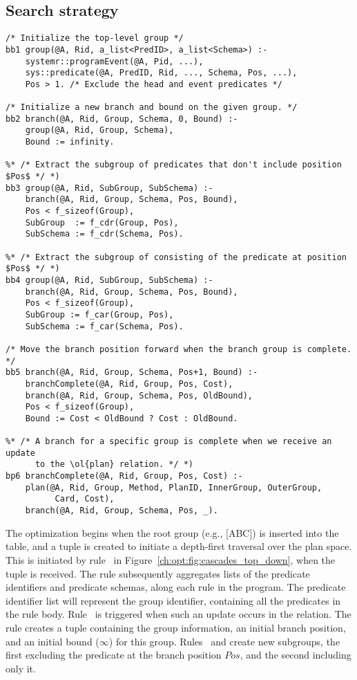 \subsection{Search strategy}
\label{ch:opt:sec:cascades_search}

\begin{figure*}
\ssp
\centering
\begin{lstlisting}
/* Initialize the top-level group */
bb1 group(@A, Rid, a_list<PredID>, a_list<Schema>) :-
    systemr::programEvent(@A, Pid, ...),
    sys::predicate(@A, PredID, Rid, ..., Schema, Pos, ...),
    Pos > 1. /* Exclude the head and event predicates */

/* Initialize a new branch and bound on the given group. */
bb2 branch(@A, Rid, Group, Schema, 0, Bound) :-
    group(@A, Rid, Group, Schema),
    Bound := infinity.

%* /* Extract the subgroup of predicates that don't include position $Pos$ */ *)
bb3 group(@A, Rid, SubGroup, SubSchema) :-
    branch(@A, Rid, Group, Schema, Pos, Bound),
    Pos < f_sizeof(Group),
    SubGroup  := f_cdr(Group, Pos),
    SubSchema := f_cdr(Schema, Pos).

%* /* Extract the subgroup of consisting of the predicate at position $Pos$ */ *)
bb4 group(@A, Rid, SubGroup, SubSchema) :-
    branch(@A, Rid, Group, Schema, Pos, Bound),
    Pos < f_sizeof(Group),
    SubGroup := f_car(Group, Pos),
    SubSchema := f_car(Schema, Pos).

/* Move the branch position forward when the branch group is complete. */
bb5 branch(@A, Rid, Group, Schema, Pos+1, Bound) :-
    branchComplete(@A, Rid, Group, Pos, Cost),
    branch(@A, Rid, Group, Schema, Pos, OldBound),
    Pos < f_sizeof(Group),
    Bound := Cost < OldBound ? Cost : OldBound.

%* /* A branch for a specific group is complete when we receive an update 
      to the \ol{plan} relation. */ *)
bp6 branchComplete(@A, Rid, Group, Pos, Cost) :-
    plan(@A, Rid, Group, Method, PlanID, InnerGroup, OuterGroup, 
          Card, Cost),
    branch(@A, Rid, Group, Schema, Pos, _).
\end{lstlisting}
\caption{\label{ch:opt:fig:cascades_top_down} Cascades top-down search strategy rules.}
\end{figure*}

The optimization begins when the root group (e.g., [ABC]) is inserted into the
 table, and a  tuple is created to initiate a depth-first
traversal over the plan space.  This is initiated by rule~ in
Figure~\ref{ch:opt:fig:cascades_top_down}, when the 
tuple is received.  The rule subsequently aggregates lists of the predicate
identifiers and predicate schemas, along each rule in the program.  The
predicate identifier list will represent the group identifier, containing all
the predicates in the rule body.  Rule~ is triggered when such an
update occurs in the  relation.  The rule creates a  tuple
containing the group information, an initial branch position, and an initial
bound ($\infty$) for this group.  Rules~ and  create new
subgroups, the first excluding the predicate at the branch position $Pos$, and
the second including only it.

